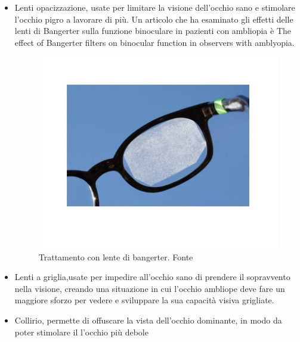 \documentclass[10pt,a4paper]{article}
\begin{document}
\begin{itemize}
		\item Lenti opacizzazione, usate per limitare la visione dell'occhio sano e stimolare l'occhio pigro a lavorare di più. Un articolo che ha esaminato gli effetti delle lenti di Bangerter sulla funzione binoculare in pazienti con ambliopia è The effect of Bangerter filters on binocular function in observers with amblyopia.
			\begin{figure}[h]
				\centering
				\includegraphics[width=0.7\linewidth]{image/penalizzazione ottica}
				\caption{Trattamento con lente di bangerter.
					Fonte\cite{Bangerter_image}}
				\label{fig:penalizzazione-ottica}
			\end{figure}
		\item Lenti a griglia,usate per impedire all'occhio sano di prendere il sopravvento nella visione, creando una situazione in cui l'occhio ambliope deve fare un maggiore sforzo per vedere e sviluppare la sua capacità visiva
		\lenti grigliate.
    	\newpage
		\item Collirio, permette di offuscare la vista dell'occhio dominante, in modo da poter stimolare il l'occhio più debole
		

\end{itemize}
\end{document}
